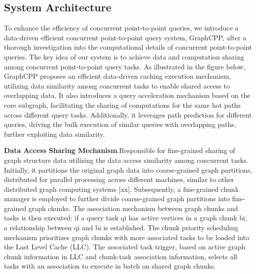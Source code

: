 \documentclass[lettersize,journal]{IEEEtran} %
\begin{document}
\subsection{System Architecture}
To enhance the efficiency of concurrent point-to-point queries, we introduce a data-driven efficient concurrent point-to-point query system, GraphCPP, after a thorough investigation into the computational details of concurrent point-to-point queries. The key idea of our system is to achieve data and computation sharing among concurrent point-to-point query tasks. As illustrated in the figure below, GraphCPP proposes an efficient data-driven caching execution mechanism, utilizing data similarity among concurrent tasks to enable shared access to overlapping data. It also introduces a query acceleration mechanism based on the core subgraph, facilitating the sharing of computations for the same hot paths across different query tasks. Additionally, it leverages path prediction for different queries, driving the bulk execution of similar queries with overlapping paths, further exploiting data similarity.

{\bf{Data Access Sharing Mechanism}}.Responsible for fine-grained sharing of graph structure data utilizing the data access similarity among concurrent tasks. Initially, it partitions the original graph data into coarse-grained graph partitions, distributed for parallel processing across different machines, similar to other distributed graph computing systems [xx]. Subsequently, a fine-grained chunk manager is employed to further divide coarse-grained graph partitions into fine-grained graph chunks. The association mechanism between graph chunks and tasks is then executed: if a query task qi has active vertices in a graph chunk bi, a relationship between qi and bi is established. The chunk priority scheduling mechanism prioritizes graph chunks with more associated tasks to be loaded into the Last Level Cache (LLC). The associated task trigger, based on active graph chunk information in LLC and chunk-task association information, selects all tasks with an association to execute in batch on shared graph chunks.
\end{document}
